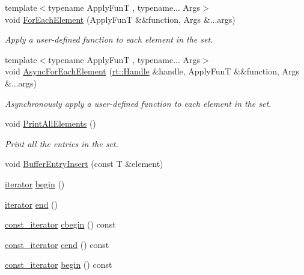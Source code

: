 \begin{DoxyCompactItemize}
{\footnotesize template$<$typename Apply\-Fun\-T , typename... Args$>$ }\\void \hyperlink{classshad_1_1Set_ae7ae217c231aa0ef54c5e2990c172b12}{For\-Each\-Element} (Apply\-Fun\-T \&\&function, Args \&...args)
\begin{DoxyCompactList}\small\item\em Apply a user-\/defined function to each element in the set. \end{DoxyCompactList}\item 
{\footnotesize template$<$typename Apply\-Fun\-T , typename... Args$>$ }\\void \hyperlink{classshad_1_1Set_ab4722765fe62737bd6b1b59635ebbe28}{Async\-For\-Each\-Element} (\hyperlink{classshad_1_1rt_1_1Handle}{rt\-::\-Handle} \&handle, Apply\-Fun\-T \&\&function, Args \&...args)
\begin{DoxyCompactList}\small\item\em Asynchronously apply a user-\/defined function to each element in the set. \end{DoxyCompactList}\item 
void \hyperlink{classshad_1_1Set_a92ae5af89da9c3232c062ecdacece447}{Print\-All\-Elements} ()
\begin{DoxyCompactList}\small\item\em Print all the entries in the set. \end{DoxyCompactList}\item 
void \hyperlink{classshad_1_1Set_aaa3c96b1f2eba65966ebc9e519adda01}{Buffer\-Entry\-Insert} (const T \&element)
\item 
\hyperlink{classshad_1_1Set_a01298773ecde90c0df1e444429bf9703}{iterator} \hyperlink{classshad_1_1Set_ae747d10b913845091066d2393ea9695b}{begin} ()
\item 
\hyperlink{classshad_1_1Set_a01298773ecde90c0df1e444429bf9703}{iterator} \hyperlink{classshad_1_1Set_a2e9ac1823ff085510d34773a0cb04852}{end} ()
\item 
\hyperlink{classshad_1_1Set_a0b2608f92f5397a25e62fad925fc177e}{const\-\_\-iterator} \hyperlink{classshad_1_1Set_ad78796bf564ae57dd14ca838b9581012}{cbegin} () const 
\item 
\hyperlink{classshad_1_1Set_a0b2608f92f5397a25e62fad925fc177e}{const\-\_\-iterator} \hyperlink{classshad_1_1Set_a0fbcb453f73d47e17b4a6c8d33994e40}{cend} () const 
\item 
\hyperlink{classshad_1_1Set_a0b2608f92f5397a25e62fad925fc177e}{const\-\_\-iterator} \hyperlink{classshad_1_1Set_a6fe767278f6a52c03242fd7deeda791a}{begin} () const 

\end{DoxyCompactItemize}
